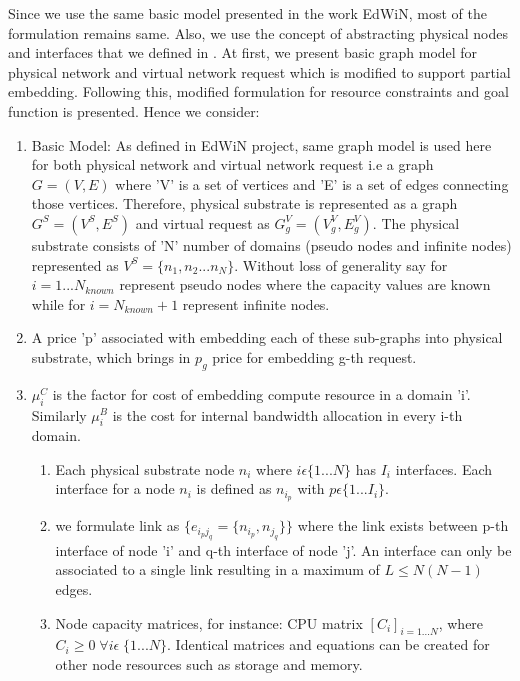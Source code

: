\documentclass[article,dr=phil,type=msc ,colorback,accentcolor=tud4b]{tudthesis}
\begin{document}
Since we use the same basic model presented in the work EdWiN, most of the formulation remains same. Also, we use the concept of abstracting physical nodes and interfaces that we defined in \cite{7116141}. At first, we present basic graph model for physical network and virtual network request which is modified to support partial embedding. Following this, modified formulation for resource constraints and goal function is presented. Hence we consider:

\begin{enumerate}[label=(\Alph*)]
	\item  Basic Model: As defined in EdWiN project, same graph model is used here for both physical network and virtual network request i.e a graph $G= (V, E)$ where 'V' is a set of vertices and 'E' is a set of edges connecting those vertices. Therefore, physical substrate is represented as a graph $G^{S} = (V^{S}, E^{S})$ and virtual request as $G^{V}_{g} = (V^{V}_{g}, E^{V}_{g})$. The physical substrate consists of 'N' number of domains (pseudo nodes and infinite nodes) represented as $V^{S} = \{n_{1},n_{2}...n_{N}\}$. Without loss of generality say for $i = 1...N_{known}$ represent pseudo nodes where the capacity values are known while for $i = N_{known} + 1$ represent infinite nodes. 
	
	\item A price 'p' associated with embedding each of these sub-graphs into physical substrate, which brings in $p_{g}$ price for embedding g-th request.
	
	\item $\mu_{i}^{C}$ is the factor for cost of embedding compute resource in a domain 'i'. Similarly $\mu_{i}^{B}$ is the cost for internal bandwidth allocation in every i-th domain.
	
	\begin{enumerate}
		\item Each physical substrate node $n_{i}$ where $i \epsilon \{1...N\}$ has $I_{i}$ interfaces. Each interface for a node $n_{i}$ is defined as $n_{i_{p}}$ with $p \epsilon \{1...I_{i}\}$. 
		
		\item we formulate link as $\{e_{i_{p}j_{q}} = \{ n_{i_{p}}, n_{j_{q}}\}  \}$ where the link exists between p-th interface of node 'i' and q-th interface of node 'j'. An interface can only be associated to a single link resulting in a maximum of $L \leq N(N-1)$ edges. 
		
		\item Node capacity matrices, for instance: CPU matrix $[ C_{i}]_{i = 1...N}$, where $C_{i} \ge 0 \; \forall i\epsilon \; \{1...N\}$. Identical matrices and equations can be created for other node resources such as storage and memory. 
		

\end{enumerate}
\end{enumerate}
\end{document}
